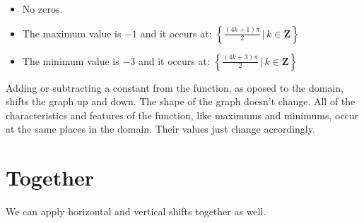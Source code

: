 \documentclass{ximera}
\begin{document}
\begin{example}
\begin{image}
\end{image}



\begin{itemize}
\item No zeros.
\item The maximum value is $-1$ and it occurs at:  $\left\{     \frac{(4k+1)\pi}{2} \, | \, k \in \textbf{Z}     \right\}$
\item The minimum value is $-3$ and it occurs at:  $\left\{    \frac{(4k+3)\pi}{2} \, | \, k \in \textbf{Z}     \right\}$
\end{itemize}














\end{example}






Adding or subtracting a constant from the function, as oposed to the domain, shifts the graph up and down.  The shape of the graph doesn't change.  All of the characteristics and features of the function, like maximums and minimums, occur at the same places in the domain.  Their values just change accordingly.





\section{Together}

We can apply horizontal and vertical shifts together as well.
\end{document}
